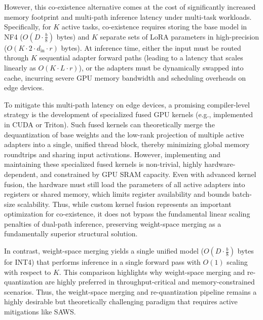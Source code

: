 However, this co-existence alternative comes at the cost of significantly increased memory footprint and multi-path inference latency under multi-task workloads. Specifically, for $K$ active tasks, co-existence requires storing the base model in NF4 ($O(D \cdot \frac{b}{8})$ bytes) and $K$ separate sets of LoRA parameters in high-precision ($O(K \cdot 2 \cdot d_{\text{in}} \cdot r)$ bytes). At inference time, either the input must be routed through $K$ sequential adapter forward paths (leading to a latency that scales linearly as $O(K \cdot L \cdot r)$), or the adapters must be dynamically swapped into cache, incurring severe GPU memory bandwidth and scheduling overheads on edge devices. 

To mitigate this multi-path latency on edge devices, a promising compiler-level strategy is the development of specialized fused GPU kernels (e.g., implemented in CUDA or Triton). Such fused kernels can theoretically merge the dequantization of base weights and the low-rank projection of multiple active adapters into a single, unified thread block, thereby minimizing global memory roundtrips and sharing input activations. However, implementing and maintaining these specialized fused kernels is non-trivial, highly hardware-dependent, and constrained by GPU SRAM capacity. Even with advanced kernel fusion, the hardware must still load the parameters of all active adapters into registers or shared memory, which limits register availability and bounds batch-size scalability. Thus, while custom kernel fusion represents an important optimization for co-existence, it does not bypass the fundamental linear scaling penalties of dual-path inference, preserving weight-space merging as a fundamentally superior structural solution.

In contrast, weight-space merging yields a single unified model ($O(D \cdot \frac{b}{8})$ bytes for INT4) that performs inference in a single forward pass with $O(1)$ scaling with respect to $K$. This comparison highlights why weight-space merging and re-quantization are highly preferred in throughput-critical and memory-constrained scenarios. Thus, the weight-space merging and re-quantization pipeline remains a highly desirable but theoretically challenging paradigm that requires active mitigations like SAWS.


